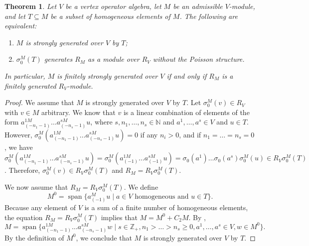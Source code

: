 \documentclass[a4paper, 12pt, reqno]{amsart}
\newtheorem{theorem}{Theorem}[section]
\theoremstyle{remark}
\DeclareMathOperator{\vspan}{span}
\begin{document}
\begin{theorem}
  \label{thr:60}
  Let $V$ be a vertex operator algebra, let $M$ be an admissible $V$-module, and let $T \subseteq M$ be a subset of homogeneous elements of $M$.
  The following are equivalent:
  \begin{enumerate}
  \item $M$ is strongly generated over $V$ by $T$;
  \item $\sigma^M_0(T)$ generates $R_M$ as a module over $R_V$ without the Poisson structure.
  \end{enumerate}
  In particular, $M$ is finitely strongly generated over $V$ if and only if $R_M$ is a finitely generated $R_V$-module.
\end{theorem}

\begin{proof}
  We assume that $M$ is strongly generated over $V$ by $T$.
  Let $\sigma^M_0(v) \in R_V$ with $v \in M$ arbitrary.
  We know that $v$ is a linear combination of elements of the form $a^{1M}_{(-n_1 - 1)}\dots a^{sM}_{(-n_s - 1)}u$, where $s, n_1, \dots, n_s \in \mathbb{N}$ and $a^1, \dots, a^s \in V$ and $u \in T$.
  However, $\sigma^M_0(a^{1M}_{(-n_1 - 1)}\dots a^{sM}_{(-n_s - 1)}u) = 0$ if any $n_i > 0$, and if $n_1 = \dots = n_s = 0$, we have $\sigma^M_0(a^{1M}_{(-n_1 - 1)}\dots a^{sM}_{(-n_s - 1)}u) = \sigma^M_0(a^{1M}_{(-1)}\dots a^{sM}_{(-1)}u) = \sigma_0(a^1)\dots\sigma_0(a^s)\sigma^M_0(u) \in R_V\sigma^M_0(T)$.
  Therefore, $\sigma^M_0(v) \in R_V\sigma^M_0(T)$ and $R_M = R_V\sigma^M_0(T)$.

  We now assume that $R_M = R_V\sigma^M_0(T)$.
  We define
  \begin{equation*}
    M^0 = \vspan\{a^M_{(-1)}u \mid \text{$a \in V$ homogeneous and $u \in T$}\}.
  \end{equation*}
  Because any element of $V$ is a sum of a finite number of homogeneous elements, the equation $R_M = R_V\sigma^M_0(T)$ implies that $M = M^0 + C_2M$.
  By \cite[Proposition 4.12]{li_abelianizing_2005},
  \begin{equation*}
    M = \vspan\{a^{1M}_{(-n_1 - 1)}\dots a^{sM}_{(-n_s - 1)}w \mid s \in \mathbb{Z}_+, n_1 > \dots > n_s \ge 0, a^1, \dots, a^s \in V, w \in M^0\}.
  \end{equation*}
  By the definition of $M^0$, we conclude that $M$ is strongly generated over $V$ by $T$.
\end{proof}
\end{document}
